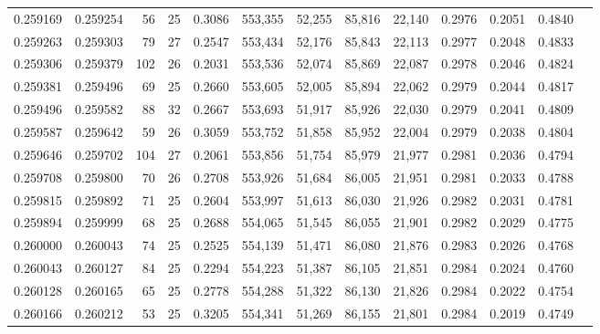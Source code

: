 \begin{tabular}{rrrrrrrrrrrrr}
0.259169 & 0.259254 &  56 &  25 &                                     0.3086 & 553,355 &  52,255 &  85,816 &  22,140 & 0.2976 & 0.2051 & 0.4840 \\
0.259263 & 0.259303 &  79 &  27 &                                     0.2547 & 553,434 &  52,176 &  85,843 &  22,113 & 0.2977 & 0.2048 & 0.4833 \\
0.259306 & 0.259379 & 102 &  26 &                                     0.2031 & 553,536 &  52,074 &  85,869 &  22,087 & 0.2978 & 0.2046 & 0.4824 \\
0.259381 & 0.259496 &  69 &  25 &                                     0.2660 & 553,605 &  52,005 &  85,894 &  22,062 & 0.2979 & 0.2044 & 0.4817 \\
0.259496 & 0.259582 &  88 &  32 &                                     0.2667 & 553,693 &  51,917 &  85,926 &  22,030 & 0.2979 & 0.2041 & 0.4809 \\
0.259587 & 0.259642 &  59 &  26 &                                     0.3059 & 553,752 &  51,858 &  85,952 &  22,004 & 0.2979 & 0.2038 & 0.4804 \\
0.259646 & 0.259702 & 104 &  27 &                                     0.2061 & 553,856 &  51,754 &  85,979 &  21,977 & 0.2981 & 0.2036 & 0.4794 \\
0.259708 & 0.259800 &  70 &  26 &                                     0.2708 & 553,926 &  51,684 &  86,005 &  21,951 & 0.2981 & 0.2033 & 0.4788 \\
0.259815 & 0.259892 &  71 &  25 &                                     0.2604 & 553,997 &  51,613 &  86,030 &  21,926 & 0.2982 & 0.2031 & 0.4781 \\
0.259894 & 0.259999 &  68 &  25 &                                     0.2688 & 554,065 &  51,545 &  86,055 &  21,901 & 0.2982 & 0.2029 & 0.4775 \\
0.260000 & 0.260043 &  74 &  25 &                                     0.2525 & 554,139 &  51,471 &  86,080 &  21,876 & 0.2983 & 0.2026 & 0.4768 \\
0.260043 & 0.260127 &  84 &  25 &                                     0.2294 & 554,223 &  51,387 &  86,105 &  21,851 & 0.2984 & 0.2024 & 0.4760 \\
0.260128 & 0.260165 &  65 &  25 &                                     0.2778 & 554,288 &  51,322 &  86,130 &  21,826 & 0.2984 & 0.2022 & 0.4754 \\
0.260166 & 0.260212 &  53 &  25 &                                     0.3205 & 554,341 &  51,269 &  86,155 &  21,801 & 0.2984 & 0.2019 & 0.4749 \\

\end{tabular}
